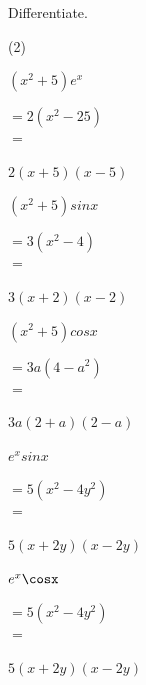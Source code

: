 \clearpage
Differentiate.
\begin{tasks}(2)
    \task \begin{exercise}$(x^2+5)e^x$
              \begin{envSolution}
                 $ =2(x^2-25)   $\\ 
                 $ =$			 
                     \begin{shortsolution}
  	                    $ 2(x+5)(x-5)$
                     \end{shortsolution}
              \end{envSolution}%
          \end{exercise}
 
    \task \begin{exercise}$(x^2+5)sinx$
              \begin{envSolution}
                 $ =3(x^2-4)   $\\ 
                 $ =$			 
                     \begin{shortsolution}
  	                    $ 3(x+2)(x-2)$
                     \end{shortsolution}
              \end{envSolution}%
          \end{exercise}
 
    \task \begin{exercise}$(x^2+5)cosx$
              \begin{envSolution}
                 $ =3a(4-a^2)   $\\ 
                 $ =$			 
                     \begin{shortsolution}
  	                    $ 3a(2+a)(2-a)$
                     \end{shortsolution}
              \end{envSolution}%
          \end{exercise}

    \task \begin{exercise}$e^x sinx$
              \begin{envSolution}
                 $ =5(x^2-4y^2)   $\\
                 $ =$			 
                     \begin{shortsolution}
  	                    $ 5(x+2y)(x-2y)$
                     \end{shortsolution}
              \end{envSolution}%
          \end{exercise}

    \task \begin{exercise}$e^x \cosx$
              \begin{envSolution}
                 $ =5(x^2-4y^2)   $\\
                 $ =$			 
                     \begin{shortsolution}
  	                    $ 5(x+2y)(x-2y)$
                     \end{shortsolution}
              \end{envSolution}%
          \end{exercise}
 
\end{tasks}
